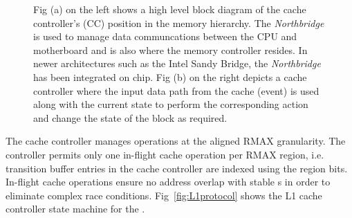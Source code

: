 \begin{figure}[h]
  \caption[Cache Controller]{Fig (a) on the left shows a high level block diagram of the cache controller's (CC) position in the memory hierarchy. The \textit{Northbridge} is used to manage data communcations between the CPU and motherboard and is also where the memory controller resides. In newer architectures such as the Intel Sandy Bridge, the \textit{Northbridge} has been integrated on chip. Fig (b) on the right depicts a cache controller where the input data path from the cache (event) is used along with the current state to perform the corresponding action and change the state of the block as required.}
  \label{fig:cache_controller_basics}
\end{figure}


The cache controller manages operations at the aligned RMAX granularity. The controller permits only one in-flight cache operation per RMAX region, i.e. transition buffer entries in the cache controller are indexed using the region bits. In-flight cache operations ensure no address overlap with stable \AB{}s in order to eliminate complex race conditions. Fig~\ref{fig:L1protocol} shows the L1 cache controller state machine for the \AC{}. 

